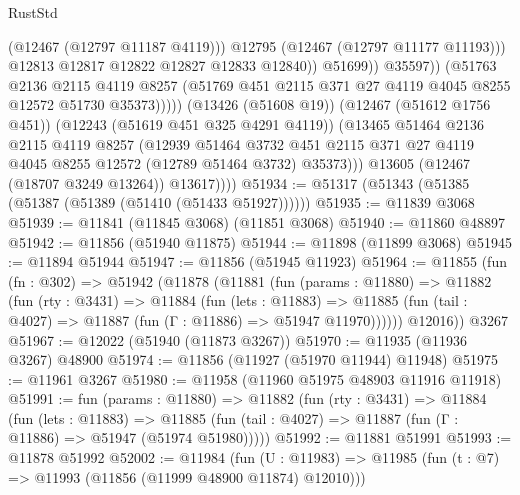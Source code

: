 \begin{lexlean}{RustStd}
\begin{coremodule}
                                    (@12467 (@12797 @11187 @4119)))
                                  @12795
                                  (@12467 (@12797 @11177 @11193)))
                                @12813
                                @12817
                                @12822
                                @12827
                                @12833
                                @12840))
                            @51699))
                        @35597))
                    (@51763
                      @2136
                      @2115
                      @4119
                      @8257
                      (@51769 @451 @2115 @371 @27 @4119 @4045 @8255 @12572 @51730 @35373)))))
              (@13426 (@51608 @19))
              (@12467 (@51612 @1756 @451))
              (@12243 (@51619 @451 @325 @4291 @4119))
              (@13465
                @51464
                @2136
                @2115
                @4119
                @8257
                (@12939
                  @51464
                  @3732
                  @451
                  @2115
                  @371
                  @27
                  @4119
                  @4045
                  @8255
                  @12572
                  (@12789 @51464 @3732)
                  @35373)))
            @13605
            (@12467 (@18707 @3249 @13264))
            @13617))))
@51934 := @51317 (@51343 (@51385 (@51387 (@51389 (@51410 (@51433 @51927))))))
@51935 := @11839 @3068
@51939 := @11841 (@11845 @3068) (@11851 @3068)
@51940 := @11860 @48897
@51942 := @11856 (@51940 @11875)
@51944 := @11898 (@11899 @3068)
@51945 := @11894 @51944
@51947 := @11856 (@51945 @11923)
@51964 := @11855
    (fun (fn : @302) =>
    @51942
      (@11878
        (@11881
          (fun (params : @11880) =>
          @11882
            (fun (rty : @3431) =>
            @11884
              (fun (lets : @11883) =>
              @11885 (fun (tail : @4027) => @11887 (fun (Γ : @11886) => @51947 @11970))))))
        @12016))
    @3267
@51967 := @12022 (@51940 (@11873 @3267))
@51970 := @11935 (@11936 @3267) @48900
@51974 := @11856 (@11927 (@51970 @11944) @11948)
@51975 := @11961 @3267
@51980 := @11958 (@11960 @51975 @48903 @11916 @11918)
@51991 := fun (params : @11880) =>
  @11882
    (fun (rty : @3431) =>
    @11884
      (fun (lets : @11883) =>
      @11885 (fun (tail : @4027) => @11887 (fun (Γ : @11886) => @51947 (@51974 @51980)))))
@51992 := @11881 @51991
@51993 := @11878 @51992
@52002 := @11984
    (fun (U : @11983) => @11985 (fun (t : @7) => @11993 (@11856 (@11999 @48900 @11874) @12010)))

\end{coremodule}
\end{lexlean}
